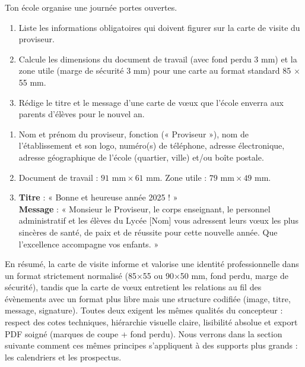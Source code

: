 \documentclass[11pt]{article}
\begin{document}
\begin{exercice}
Ton école organise une journée portes ouvertes. 
\begin{enumerate}
\item Liste les informations obligatoires qui doivent figurer sur la carte de visite du proviseur.
\item Calcule les dimensions du document de travail (avec fond perdu 3 mm) et la zone utile (marge de sécurité 3 mm) pour une carte au format standard 85 $\times$ 55 mm.
\item Rédige le titre et le message d'une carte de vœux que l'école enverra aux parents d'élèves pour le nouvel an.
\end{enumerate}
\end{exercice}

\begin{corrige}[Exercice]
\begin{enumerate}
\item Nom et prénom du proviseur, fonction (« Proviseur »), nom de l'établissement et son logo, numéro(s) de téléphone, adresse électronique, adresse géographique de l'école (quartier, ville) et/ou boîte postale.
\item Document de travail : $91 \text{ mm} \times 61 \text{ mm}$. Zone utile : $79 \text{ mm} \times 49 \text{ mm}$.
\item \textbf{Titre} : « Bonne et heureuse année 2025 ! » \\
\textbf{Message} : « Monsieur le Proviseur, le corps enseignant, le personnel administratif et les élèves du Lycée [Nom] vous adressent leurs vœux les plus sincères de santé, de paix et de réussite pour cette nouvelle année. Que l'excellence accompagne vos enfants. »
\end{enumerate}
\end{corrige}

En résumé, la carte de visite informe et valorise une identité professionnelle dans un format strictement normalisé (85$\times$55 ou 90$\times$50 mm, fond perdu, marge de sécurité), tandis que la carte de vœux entretient les relations au fil des évènements avec un format plus libre mais une structure codifiée (image, titre, message, signature). Toutes deux exigent les mêmes qualités du concepteur : respect des cotes techniques, hiérarchie visuelle claire, lisibilité absolue et export PDF soigné (marques de coupe + fond perdu). Nous verrons dans la section suivante comment ces mêmes principes s'appliquent à des supports plus grands : les calendriers et les prospectus.
\end{document}
